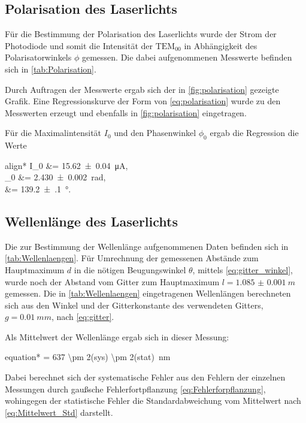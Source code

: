 \subsection{Polarisation des Laserlichts}\label{sec:Polarisation}
	Für die Bestimmung der Polarisation des Laserlichts wurde der Strom der Photodiode und somit
	die Intensität der $\mathrm{TEM}_{00}$ in Abhängigkeit des Polarisatorwinkels $\phi$ gemessen. Die dabei aufgenommenen
	Messwerte befinden sich in \cref{tab:Polarisation}. 
	
	\FloatBarrier
	Durch Auftragen der Messwerte ergab sich der in \cref{fig:polarisation} gezeigte Grafik.
	Eine Regressionskurve der Form von \eqref{eq:polarisation} wurde zu den Messwerten erzeugt und
	ebenfalls in \cref{fig:polarisation} eingetragen.
	
	\FloatBarrier
	Für die Maximalintensität $I_0$ und den Phasenwinkel $\phi_0$ ergab die Regression die Werte
	
	
	\begin{empheq}{align*}
		I_0 &= \SI{15.62(4)}{\micro\ampere},\\
		\phi_0 &= \SI{2.430(2)}{rad},\\
			   &= \SI{139.2(1)}{\degree}.
	\end{empheq}
	

\subsection{Wellenlänge des Laserlichts}\label{sec:Wellenlaenge}
	Die zur Bestimmung der Wellenlänge aufgenommenen Daten befinden sich in \cref{tab:Wellenlaengen}. Für Umrechnung
	der gemessenen Abstände zum Hauptmaximum $d$ in die nötigen Beugungswinkel $\theta$, mittels \eqref{eq:gitter_winkel}, 
	wurde noch der Abstand vom Gitter zum Hauptmaximum $l = \SI{1.085(1)}{m}$ gemessen. Die in \cref{tab:Wellenlaengen}  eingetragenen Wellenlängen 
	berechneten sich aus den Winkel und der Gitterkonstante des verwendeten Gitters, $g = \SI{0.01}{mm}$, nach \eqref{eq:gitter}.
	
	\FloatBarrier
	Als Mittelwert der Wellenlänge ergab sich in dieser Messung:
	\begin{empheq}{equation*}
		\mean{\lambda} = \SI[parse-numbers=false]{637 \pm 2(sys) \pm 2(stat)}{nm}
	\end{empheq} 
	Dabei berechnet sich der systematische Fehler aus den Fehlern der einzelnen Messungen durch gaußsche Fehlerfortpflanzung
	\eqref{eq:Fehlerforpflanzung}, wohingegen der statistische Fehler die Standardabweichung vom Mittelwert nach \eqref{eq:Mittelwert_Std}
	darstellt.
	
